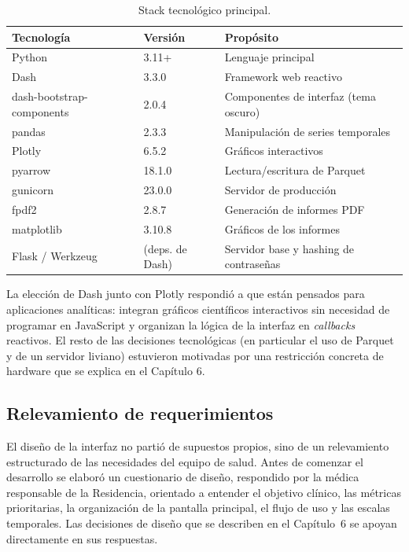 \documentclass[12pt,a4paper]{article}
\begin{document}
    \begin{table}[h]
        \centering
        \begin{tabular}{l l l}
            \hline
            \textbf{Tecnología} & \textbf{Versión} & \textbf{Propósito} \\
            \hline
            Python & 3.11+ & Lenguaje principal \\
            Dash & 3.3.0 & Framework web reactivo \\
            dash-bootstrap-components & 2.0.4 & Componentes de interfaz (tema oscuro) \\
            pandas & 2.3.3 & Manipulación de series temporales \\
            Plotly & 6.5.2 & Gráficos interactivos \\
            pyarrow & 18.1.0 & Lectura/escritura de Parquet \\
            gunicorn & 23.0.0 & Servidor de producción \\
            fpdf2 & 2.8.7 & Generación de informes PDF \\
            matplotlib & 3.10.8 & Gráficos de los informes \\
            Flask / Werkzeug & (deps. de Dash) & Servidor base y hashing de contraseñas \\
            \hline
        \end{tabular}
        \caption{Stack tecnológico principal.}
        \label{tab:stack}
    \end{table}

    La elección de Dash junto con Plotly respondió a que están pensados para aplicaciones analíticas: integran gráficos científicos interactivos sin necesidad de programar en JavaScript y organizan la lógica de la interfaz en \textit{callbacks} reactivos. El resto de las decisiones tecnológicas (en particular el uso de Parquet y de un servidor liviano) estuvieron motivadas por una restricción concreta de hardware que se explica en el Capítulo 6.

    \subsection{Relevamiento de requerimientos}
    El diseño de la interfaz no partió de supuestos propios, sino de un relevamiento estructurado de las necesidades del equipo de salud. Antes de comenzar el desarrollo se elaboró un cuestionario de diseño, respondido por la médica responsable de la Residencia, orientado a entender el objetivo clínico, las métricas prioritarias, la organización de la pantalla principal, el flujo de uso y las escalas temporales. Las decisiones de diseño que se describen en el Capítulo~6 se apoyan directamente en sus respuestas.
\end{document}
